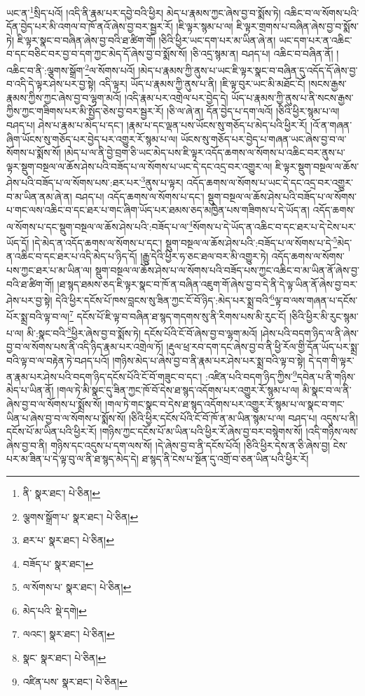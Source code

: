 ཡང་ན་\footnote{ནི་  སྣར་ཐང་།  པེ་ཅིན། }སྲིད་པའོ། །འདི་ནི་རྣམ་པར་དབྱེ་བའི་ཕྱིར། མེད་པ་རྣམས་ཀྱང་ཞེས་བྱ་བ་སྨོས་ཏེ། འཆིང་བ་ལ་སོགས་པའི་དོན་བྱེད་པར་མི་འགལ་བ་ཁོ་ནའོ་ཞེས་བྱ་བར་སྦྱར་རོ། །ཇི་ལྟར་སྙམ་པ་ལ། ཇི་ལྟར་གྲགས་པ་བཞིན་ཞེས་བྱ་བ་སྨོས་ཏེ། ཇི་ལྟར་སྣང་བ་བཞིན་ཞེས་བྱ་བའི་ཐ་ཚིག་གོ། །ཅིའི་ཕྱིར་ཡང་དག་པར་མ་ཡིན་ཞེ་ན། ཡང་དག་པར་ན་འཆིང་བ་དང་བཅིང་བར་བྱ་བ་དག་ཀྱང་མེད་དོ་ཞེས་བྱ་བ་སྨོས་སོ། །ཅི་འདྲ་སྙམ་ན། བཤད་པ། འཆིང་བ་བཞིན་ནོ། །འཆིང་བ་ནི་:ལྕགས་སྒྲོག་\footnote{ལྕགས་སྒྲོག་པ་  སྣར་ཐང་།  པེ་ཅིན། }ལ་སོགས་པའོ། །མེད་པ་རྣམས་ཀྱི་ནུས་པ་ཡང་ཇི་ལྟར་སྣང་བ་བཞིན་དུ་འདོད་དོ་ཞེས་བྱ་བ་འདི་དེ་ལྟར་ཤེས་པར་བྱ་སྟེ། འདི་ལྟར། ཡོད་པ་རྣམས་ཀྱི་ནུས་པ་ནི། །ཇི་ལྟ་བུར་ཡང་མི་མཐོང་ངོ། །སངས་རྒྱས་རྣམས་ཀྱིས་ཀྱང་ཞེས་བྱ་བ་ལྷག་མའོ། །འདི་རྣམ་པར་འགྲེལ་པར་བྱེད་དེ། ཡོད་པ་རྣམས་ཀྱི་ནུས་པ་ནི་སངས་རྒྱས་ཀྱིས་ཀྱང་གཟིགས་པར་མི་སྤྱོད་ཅེས་བྱ་བར་སྦྱར་རོ། །ཅི་ལ་ཞེ་ན། དོན་བྱེད་པ་དག་ལའོ། །ཅིའི་ཕྱིར་སྙམ་པ་ལ། བཤད་པ། ཤེས་པ་རྣམ་པ་མེད་པ་དང་། །རྣམ་པ་དང་ལྡན་པས་ཡོངས་སུ་གཅོད་པ་མེད་པའི་ཕྱིར་རོ། །འོ་ན་གཞན་ཞིག་ཡོངས་སུ་གཅོད་པར་བྱེད་པར་འགྱུར་རོ་སྙམ་པ་ལ། ཡོངས་སུ་གཅོད་པར་བྱེད་པ་གཞན་ཡང་ཞེས་བྱ་བ་ལ་སོགས་པ་སྨོས་སོ། །མེད་པ་ལ་ནི་བྱེ་བྲག་ཅི་ཡང་མེད་པས་ཇི་ལྟར་འདོད་ཆགས་ལ་སོགས་པ་འཆིང་བར་ནུས་པ་ལྟར་སྡུག་བསྔལ་ལ་ཆོས་ཤེས་པའི་བཟོད་པ་ལ་སོགས་པ་ཡང་དེ་དང་འདྲ་བར་འགྱུར་ལ། ཇི་ལྟར་སྡུག་བསྔལ་ལ་ཆོས་ཤེས་པའི་བཟོད་པ་ལ་སོགས་པས་:ཐར་པར་\footnote{ཐར་པ་  སྣར་ཐང་།  པེ་ཅིན། }ནུས་པ་ལྟར། འདོད་ཆགས་ལ་སོགས་པ་ཡང་དེ་དང་འདྲ་བར་འགྱུར་བ་མ་ཡིན་ནམ་ཞེ་ན། བཤད་པ། འདོད་ཆགས་ལ་སོགས་པ་དང་། སྡུག་བསྔལ་ལ་ཆོས་ཤེས་པའི་བཟོད་པ་ལ་སོགས་པ་གང་ལས་འཆིང་བ་དང་ཐར་པ་གང་ཞིག་ཡོད་པར་ཐམས་ཅད་མཁྱེན་པས་གཟིགས་པ་དེ་ཡོད་ན། འདོད་ཆགས་ལ་སོགས་པ་དང་སྡུག་བསྔལ་ལ་ཆོས་ཤེས་པའི་:བཟོད་པ་ལ་\footnote{བཟོད་པ་  སྣར་ཐང་། }སོགས་པ་དེ་ཡོད་ན་འཆིང་བ་དང་ཐར་པ་དེ་ངེས་པར་ཡོད་དོ། །དེ་མེད་ན་འདོད་ཆགས་ལ་སོགས་པ་དང་། སྡུག་བསྔལ་ལ་ཆོས་ཤེས་པའི་:བཟོད་པ་ལ་སོགས་པ་དེ་\footnote{ལ་སོགས་པ་  སྣར་ཐང་།  པེ་ཅིན། }མེད་ན་འཆིང་བ་དང་ཐར་པ་འདི་མེད་པ་ཉིད་དོ། །རྒྱུ་དེའི་ཕྱིར་ཧ་ཅང་ཐལ་བར་མི་འགྱུར་ཏེ། འདོད་ཆགས་ལ་སོགས་པས་ཀྱང་ཐར་པ་མ་ཡིན་ལ། སྡུག་བསྔལ་ལ་ཆོས་ཤེས་པ་ལ་སོགས་པའི་བཟོད་པས་ཀྱང་འཆིང་བ་མ་ཡིན་ནོ་ཞེས་བྱ་བའི་ཐ་ཚིག་གོ། །ཐ་སྙད་ཐམས་ཅད་ཇི་ལྟར་སྣང་བ་ཁོ་ན་བཞིན་འཇུག་གོ་ཞེས་བྱ་བ་དེ་ནི་དེ་ལྟ་ཡིན་ནོ་ཞེས་བྱ་བར་ཤེས་པར་བྱ་སྟེ། དེའི་ཕྱིར་དངོས་པོ་ཁས་བླངས་སུ་ཟིན་ཀྱང་ངོ་བོ་ཉིད་:མེད་པར་སྨྲ་བའི་\footnote{མེད་པའི་  སྡེ་དགེ། }ལྟ་བ་ལས་གཞན་པ་དངོས་པོར་སྨྲ་བའི་ལྟ་བ་ལ།\footnote{ལའང་།  སྣར་ཐང་།  པེ་ཅིན། } དངོས་པོ་ཇི་ལྟ་བ་བཞིན་ཐ་སྙད་གདགས་སུ་ནི་རིགས་པས་མི་རུང་ངོ། །ཅིའི་ཕྱིར་མི་རུང་སྙམ་པ་ལ། མི་:སྣང་བའི་\footnote{སྣང་  སྣར་ཐང་།  པེ་ཅིན། }ཕྱིར་ཞེས་བྱ་བ་སྨོས་ཏེ། དངོས་པོའི་ངོ་བོ་ཞེས་བྱ་བ་ལྷག་མའོ། །ཤེས་པའི་བདག་ཉིད་ལ་ནི་ཞེས་བྱ་བ་ལ་སོགས་པས་ནི་འདི་ཉིད་རྣམ་པར་འགྲེལ་ཏོ། །རྡུལ་ཕྲ་རབ་དག་དང་ཞེས་བྱ་བ་ནི་ཕྱི་རོལ་གྱི་དོན་ཡོད་པར་སྨྲ་བའི་ལྟ་བ་ལ་བརྟེན་ཏེ་བཤད་པའོ། །གཉིས་མེད་པ་ཞེས་བྱ་བ་ནི་རྣམ་པར་ཤེས་པར་སྨྲ་བའི་ལྟ་བ་སྟེ། དེ་དག་གི་ལྟར་ན་རྣམ་པར་ཤེས་པའི་བདག་ཉིད་དངོས་པོའི་ངོ་བོ་གཟུང་བ་དང་། :འཛིན་པའི་བདག་ཉིད་ཀྱིས་\footnote{འཛིན་པས་  སྣར་ཐང་།  པེ་ཅིན། }དབེན་པ་ནི་གཉིས་མེད་པ་ཡིན་ནོ། །གལ་ཏེ་མི་སྣང་དུ་ཟིན་ཀྱང་ཁོ་བོ་དེས་ཐ་སྙད་འདོགས་པར་འགྱུར་རོ་སྙམ་པ་ལ། མི་སྣང་བ་ལ་ནི་ཞེས་བྱ་བ་ལ་སོགས་པ་སྨྲོས་སོ། །གལ་ཏེ་གང་སྣང་བ་དེས་ཐ་སྙད་འདོགས་པར་འགྱུར་རོ་སྙམ་པ་ལ་སྣང་བ་གང་ཡིན་པ་ཞེས་བྱ་བ་ལ་སོགས་པ་སྨོས་སོ། །ཅིའི་ཕྱིར་དངོས་པོའི་ངོ་བོ་ཁོ་ན་མ་ཡིན་སྙམ་པ་ལ། བཤད་པ། འདུས་པ་ནི། དངོས་པོ་མ་ཡིན་པའི་ཕྱིར་རོ། །གཉིས་ཀྱང་དངོས་པོ་མ་ཡིན་པའི་ཕྱིར་རོ་ཞེས་བྱ་བར་བསྙེགས་སོ། །འདི་གཉིས་ལས་ཞེས་བྱ་བ་ནི། གཉིས་དང་འདུས་པ་དག་ལས་སོ། །དེ་ཞེས་བྱ་བ་ནི་དངོས་པོའོ། །ཅིའི་ཕྱིར་དེས་ན་ཅི་ཞེས་བྱ། ངེས་པར་མ་ཟིན་པ་དེ་ལྟ་བུ་ལ་ནི་ཐ་སྙད་མེད་དེ། ཐ་སྙད་ནི་ངེས་པ་སྔོན་དུ་འགྲོ་བ་ཅན་ཡིན་པའི་ཕྱིར་རོ། 